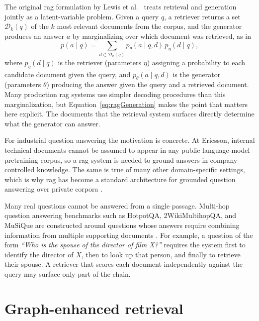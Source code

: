 \documentclass[english, bibtex]{kththesis}               %
\numberwithin{listing}{chapter}
\begin{document}
The original \gls{rag} formulation by Lewis et al.\ \cite{lewis2020rag} treats retrieval and generation jointly as a latent-variable problem. Given a query \(q\), a retriever returns a set \(\mathcal{D}_k(q)\) of the \(k\) most relevant documents from the corpus, and the generator produces an answer \(a\) by marginalizing over which document was retrieved, as in
\begin{equation}
\label{eq:ragGeneration}
p(a \mid q) =
\sum_{d \in \mathcal{D}_k(q)}
p_\theta(a \mid q,d)\,p_\eta(d \mid q),
\end{equation}
where \(p_\eta(d \mid q)\) is the retriever (parameters \(\eta\)) assigning a probability to each candidate document given the query, and \(p_\theta(a \mid q, d)\) is the generator (parameters \(\theta\)) producing the answer given the query and a retrieved document. Many production \gls{rag} systems use simpler decoding procedures than this marginalization, but Equation~\ref{eq:ragGeneration} makes the point that matters here explicit. The documents that the retrieval system surfaces directly determine what the generator can answer.

For industrial question answering the motivation is concrete. At Ericsson, internal technical documents cannot be assumed to appear in any public language-model pretraining corpus, so a \gls{rag} system is needed to ground answers in company-controlled knowledge. The same is true of many other domain-specific settings, which is why \gls{rag} has become a standard architecture for grounded question answering over private corpora \cite{gao2023ragsurvey}.

Many real questions cannot be answered from a single passage. Multi-hop question answering benchmarks such as HotpotQA, 2WikiMultihopQA, and MuSiQue are constructed around questions whose answers require combining information from multiple supporting documents \cite{ho2020twowiki,yang2018hotpotqa,trivedi2022musique}. For example, a question of the form \emph{``Who is the spouse of the director of film X?''} requires the system first to identify the director of \(X\), then to look up that person, and finally to retrieve their spouse. A retriever that scores each document independently against the query may surface only part of the chain.

\section{Graph-enhanced retrieval}
\label{sec:backgroundHybridGraph}
\end{document}
